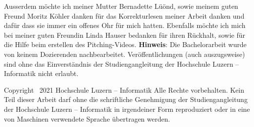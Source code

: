 Ausserdem möchte ich meiner Mutter Bernadette Lüönd, sowie meinem guten Freund Moritz Köhler danken für das Korrekturlesen meiner Arbeit danken und dafür dass sie immer ein offenes Ohr für mich hatten.
Ebenfalls möchte ich mich bei meiner guten Freundin Linda Hauser bedanken für ihren Rückhalt, sowie für die Hilfe beim erstellen des Pitching-Videos.
\newline \newline \newline
\newline \newline \newline
\newline \newline \newline
{\textbf{Hinweis}}: Die Bachelorarbeit wurde von keinem Dozierenden nachbearbeitet. Ver\"offentlichungen (auch auszugsweise) sind ohne das Einverst\"andnis der Studiengangleitung der Hochschule Luzern -- Informatik nicht erlaubt.

\clearpage
Copyright \textcopyright\ 2021 Hochschule Luzern -- Informatik \newline \newline
Alle Rechte vorbehalten. Kein Teil dieser Arbeit darf ohne die schriftliche Genehmigung der Studiengangleitung der Hochschule Luzern -- Informatik in irgendeiner Form reproduziert oder in eine von Maschinen verwendete Sprache \"ubertragen werden.

\newpage
{}

